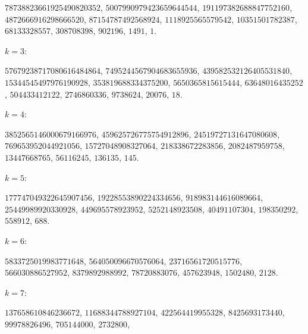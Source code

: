 $78738823661925490820352$,\allowbreak{} 
$5007990979423659644544$,\allowbreak{} 
$191197382688847752160$,\allowbreak{} 
$4872666916298666520$,\allowbreak{} 
$87154787492568924$,\allowbreak{} 
$1118925565579542$,\allowbreak{} 
$10351501782387$,\allowbreak{} 
$68133328557$,\allowbreak{} 
$308708398$,\allowbreak{} 
$902196$,\allowbreak{} 
$1491$,\allowbreak{} 
$1$.\par\endgroup
\par\smallskip\noindent$k=3$: \begingroup\small\raggedright
$57679238717080616484864$,\allowbreak{} 
$7495244567904683655936$,\allowbreak{} 
$439582532126405531840$,\allowbreak{} 
$15344545497976190928$,\allowbreak{} 
$353819688334375200$,\allowbreak{} 
$5650365815615444$,\allowbreak{} 
$63648016435252$,\allowbreak{} 
$504433412122$,\allowbreak{} 
$2746860336$,\allowbreak{} 
$9738624$,\allowbreak{} 
$20076$,\allowbreak{} 
$18$.\par\endgroup
\par\smallskip\noindent$k=4$: \begingroup\small\raggedright
$3852565146000679166976$,\allowbreak{} 
$459625726775754912896$,\allowbreak{} 
$24519727131647080608$,\allowbreak{} 
$769653952044921056$,\allowbreak{} 
$15727048908327064$,\allowbreak{} 
$218338672283856$,\allowbreak{} 
$2082487959758$,\allowbreak{} 
$13447668765$,\allowbreak{} 
$56116245$,\allowbreak{} 
$136135$,\allowbreak{} 
$145$.\par\endgroup
\par\smallskip\noindent$k=5$: \begingroup\small\raggedright
$177747049322645907456$,\allowbreak{} 
$19228553890224334656$,\allowbreak{} 
$918983144616089664$,\allowbreak{} 
$25449989920330928$,\allowbreak{} 
$449695578923952$,\allowbreak{} 
$5252148923508$,\allowbreak{} 
$40491107304$,\allowbreak{} 
$198350292$,\allowbreak{} 
$558912$,\allowbreak{} 
$688$.\par\endgroup
\par\smallskip\noindent$k=6$: \begingroup\small\raggedright
$5833725019983771648$,\allowbreak{} 
$564050096670576064$,\allowbreak{} 
$23716561720515776$,\allowbreak{} 
$566030886527952$,\allowbreak{} 
$8379892988992$,\allowbreak{} 
$78720883076$,\allowbreak{} 
$457623948$,\allowbreak{} 
$1502480$,\allowbreak{} 
$2128$.\par\endgroup
\par\smallskip\noindent$k=7$: \begingroup\small\raggedright
$137658610846236672$,\allowbreak{} 
$11688344788927104$,\allowbreak{} 
$422564419955328$,\allowbreak{} 
$8425693173440$,\allowbreak{} 
$99978826496$,\allowbreak{} 
$705144000$,\allowbreak{} 
$2732800$,\allowbreak{} 
